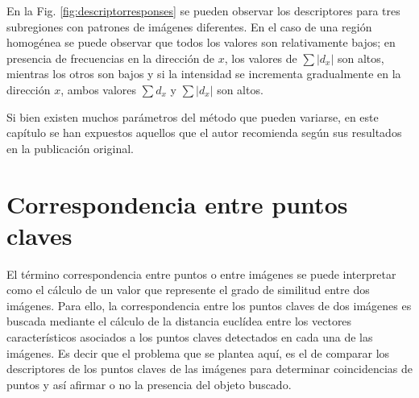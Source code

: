       En la Fig. \ref{fig:descriptorresponses} se pueden observar los descriptores para tres subregiones con patrones de imágenes diferentes. En el caso de una región homogénea se puede observar que todos los valores son relativamente bajos; en presencia de frecuencias en la dirección de $x$, los valores de $\sum{|d_x|}$ son altos, mientras los otros son bajos y si la intensidad se incrementa gradualmente en la dirección $x$, ambos valores $\sum{d_x}$ y $\sum{|d_x|}$ son altos.
      
      Si bien existen muchos parámetros del método que pueden variarse, en este capítulo se han expuestos aquellos que el autor \cite{Bay:2008:SRF} recomienda según sus resultados en la publicación original.
\section{Correspondencia entre puntos claves}
\label{sec:correspop_ptos_claves}
El término correspondencia entre puntos o entre imágenes se puede interpretar como el cálculo de un valor que represente el grado de similitud entre dos imágenes. Para ello, la correspondencia entre los puntos claves de dos imágenes es buscada mediante el cálculo de la distancia euclídea entre los vectores característicos asociados a los puntos claves detectados en cada una de las imágenes. %
Es decir que el problema que se plantea aquí, es el de comparar los descriptores de los puntos claves de las imágenes para determinar coincidencias de puntos y así afirmar o no la presencia del objeto buscado.

